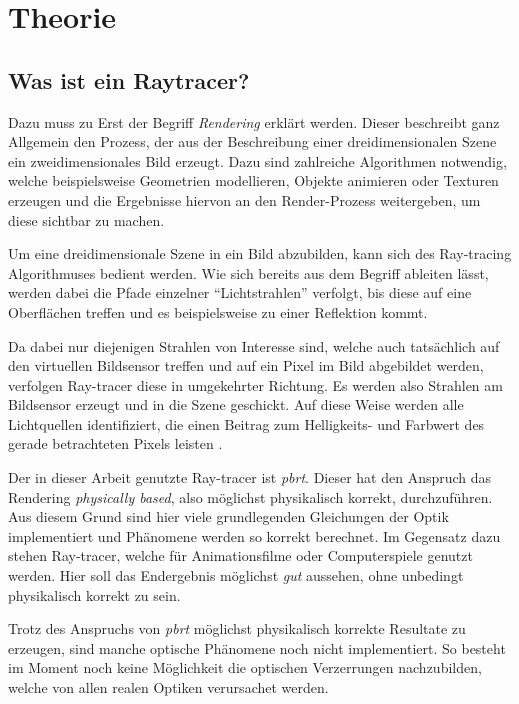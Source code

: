 \section{Theorie}

\subsection{Was ist ein Raytracer?}

Dazu muss zu Erst der Begriff \textit{Rendering} erklärt werden. Dieser beschreibt ganz Allgemein den Prozess, der aus der Beschreibung einer dreidimensionalen Szene ein zweidimensionales Bild erzeugt. Dazu sind zahlreiche Algorithmen notwendig, welche beispielsweise Geometrien modellieren, Objekte animieren oder Texturen erzeugen und die Ergebnisse hiervon an den Render-Prozess weitergeben, um diese sichtbar zu machen. 

Um eine dreidimensionale Szene in ein Bild abzubilden, kann sich des Ray-tracing Algorithmuses bedient werden. Wie sich bereits aus dem Begriff ableiten lässt, werden dabei die Pfade einzelner "`Lichtstrahlen"' verfolgt, bis diese auf eine Oberflächen treffen und es beispielsweise zu einer Reflektion kommt. 

Da dabei nur diejenigen Strahlen von Interesse sind, welche auch tatsächlich auf den virtuellen Bildsensor treffen und auf ein Pixel im Bild abgebildet werden, verfolgen Ray-tracer diese in umgekehrter Richtung. Es werden also Strahlen am Bildsensor erzeugt und in die Szene geschickt. Auf diese Weise werden alle Lichtquellen identifiziert, die einen Beitrag zum Helligkeits- und Farbwert des gerade betrachteten Pixels leisten \cite{pbrt_book}. 

Der in dieser Arbeit genutzte Ray-tracer ist \textit{pbrt}\cite{pbrt}. Dieser hat den Anspruch das Rendering \textit{physically based}, also möglichst physikalisch korrekt, durchzuführen. Aus diesem Grund sind hier viele grundlegenden Gleichungen der Optik implementiert und Phänomene werden so korrekt berechnet. Im Gegensatz dazu stehen Ray-tracer, welche für Animationsfilme oder Computerspiele genutzt werden. Hier soll das Endergebnis möglichst \textit{gut} aussehen, ohne unbedingt physikalisch korrekt zu sein. 

Trotz des Anspruchs von \textit{pbrt} möglichst physikalisch korrekte Resultate zu erzeugen, sind manche optische Phänomene noch nicht implementiert. So besteht im Moment noch keine Möglichkeit die optischen Verzerrungen nachzubilden, welche von allen realen Optiken verursachet werden.

